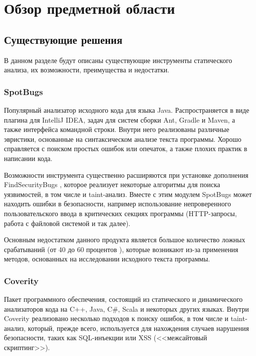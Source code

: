 \section{Обзор предметной области}

\subsection{Существующие решения}

В данном разделе будут описаны существующие инструменты статического анализа, их возможности, преимущества и недостатки.

\subsubsection{SpotBugs}

Популярный анализатор исходного кода для языка Java. Распространяется в виде плагина для IntelliJ IDEA, задач для систем сборки Ant, Gradle и Maven, а также интерфейса командной строки. Внутри него реализованы различные эвристики, основанные на синтаксическом анализе текста программы. Хорошо справляется с поиском простых ошибок или опечаток, а также плохих практик в написании кода.

Возможности инструмента существенно расширяются при установке дополнения FindSecurityBugs \cite{fsbugs}, которое реализует некоторые алгоритмы для поиска уязвимостей, в том числе и taint-анализ. Вместе с этим модулем SpotBugs может находить ошибки в безопасности, например использование непроверенного пользовательского ввода в критических секциях программы (HTTP-запросы, работа с файловой системой и так далее).

Основным недостатком данного продукта является большое количество ложных срабатываний (от 40 до 60 процентов \cite{fsbugs-fp}), которые возникают из-за применения методов, основанных на исследовании исходного текста программы.

\subsubsection{Coverity}

Пакет программного обеспечения, состоящий из статического и динамического анализаторов кода на C++, Java, C\#, Scala и некоторых других языках. Внутри Coverity реализовано несколько подходов к поиску ошибок, в том числе и taint-анализ, который, прежде всего, используется для нахождения случаев нарушения безопасности, таких как SQL-инъекции или XSS (<<межсайтовый скриптинг>>).

